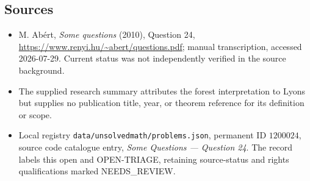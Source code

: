 \documentclass[11pt]{article}
\begin{document}
\subsection{Sources}
\begin{itemize}
\item M. Ab\'ert, \emph{Some questions} (2010), Question 24, \url{https://www.renyi.hu/~abert/questions.pdf}; manual transcription, accessed 2026-07-29. Current status was not independently verified in the source background.
\item The supplied research summary attributes the forest interpretation to Lyons but supplies no publication title, year, or theorem reference for its definition or scope.
\item Local registry \texttt{data/unsolvedmath/problems.json}, permanent ID $1200024$, source code catalogue entry, \emph{Some Questions --- Question 24}. The record labels this open and OPEN-TRIAGE, retaining source-status and rights qualifications marked NEEDS\_REVIEW.
\end{itemize}
\end{document}
